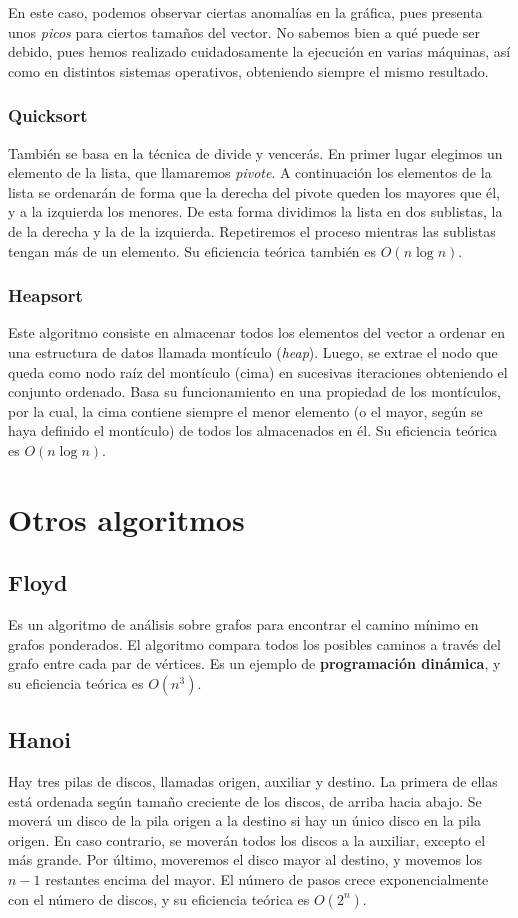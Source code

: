 \documentclass[11pt]{article}
\begin{document}
En este caso, podemos observar ciertas anomalías en la gráfica, pues presenta unos \textit{picos} para ciertos tamaños del vector. No sabemos bien a qué puede ser debido, pues hemos realizado cuidadosamente la ejecución en varias máquinas, así como en distintos sistemas operativos, obteniendo siempre el mismo resultado.

\subsubsection*{Quicksort}
También se basa en la técnica de divide y vencerás.
En primer lugar elegimos un elemento de la lista, que llamaremos \textit{pivote}. A continuación los elementos de la lista se ordenarán de forma que la derecha del pivote queden los mayores que él, y a la izquierda los menores. De esta forma dividimos la lista en dos sublistas, la de la derecha y la de la izquierda. Repetiremos el proceso mientras las sublistas tengan más de un elemento. Su eficiencia teórica también es $O(n\log n)$.


\subsubsection*{Heapsort}
Este algoritmo consiste en almacenar todos los elementos del vector a ordenar en una estructura de datos llamada montículo (\textit{heap}). Luego, se extrae el nodo que queda como nodo raíz del montículo (cima) en sucesivas iteraciones obteniendo el conjunto ordenado. Basa su funcionamiento en una propiedad de los montículos, por la cual, la cima contiene siempre el menor elemento (o el mayor, según se haya definido el montículo) de todos los almacenados en él. Su eficiencia teórica es $O(n\log n)$.\\

\newpage
\enlargethispage{7\baselineskip}
\section*{Otros algoritmos}
\subsection*{Floyd}
Es un algoritmo de análisis sobre grafos para encontrar el camino mínimo en grafos ponderados. El algoritmo compara todos los posibles caminos a través del grafo entre cada par de vértices. Es un ejemplo de \textbf{programación dinámica}, y su eficiencia teórica es $O(n^3)$.

\subsection*{Hanoi}
Hay tres pilas de discos, llamadas origen, auxiliar y destino. La primera de ellas está ordenada según tamaño creciente de los discos, de arriba hacia abajo. Se moverá un disco de la pila origen a la destino si hay un único disco en la pila origen. En caso contrario, se moverán todos los discos a la auxiliar, excepto el más grande. Por último, moveremos el disco mayor al destino, y movemos los $n-1$ restantes encima del mayor. El número de pasos crece exponencialmente con el número de discos, y su eficiencia teórica es $O(2^n)$.
\end{document}
